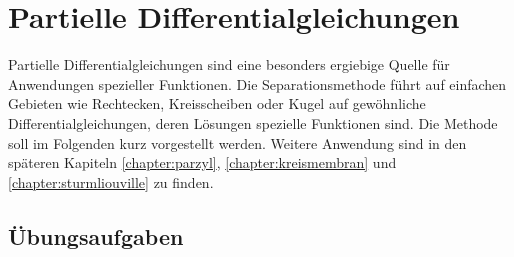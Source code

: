 %
%
%
\chapter{Partielle Differentialgleichungen
\label{buch:chapter:pde}}
Partielle Differentialgleichungen sind eine besonders ergiebige
Quelle für Anwendungen spezieller Funktionen.
Die Separationsmethode führt auf einfachen Gebieten wie Rechtecken,
Kreisscheiben oder Kugel auf gewöhnliche Differentialgleichungen,
deren Lösungen spezielle Funktionen sind.
Die Methode soll im Folgenden kurz vorgestellt werden.
Weitere Anwendung sind in den späteren Kapiteln 
\ref{chapter:parzyl},
\ref{chapter:kreismembran}
und
\ref{chapter:sturmliouville}
zu finden.




%
%


\section*{Übungsaufgaben}
\begin{uebungsaufgaben}
\end{uebungsaufgaben}


